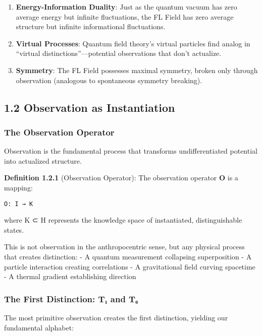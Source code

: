 \begin{enumerate}
\def\labelenumi{\arabic{enumi}.}
\item
  \textbf{Energy-Information Duality}: Just as the quantum vacuum has
  zero average energy but infinite fluctuations, the FL Field has zero
  average structure but infinite informational fluctuations.
\item
  \textbf{Virtual Processes}: Quantum field theory's virtual particles
  find analog in ``virtual distinctions''---potential observations that
  don't actualize.
\item
  \textbf{Symmetry}: The FL Field possesses maximal symmetry, broken
  only through observation (analogous to spontaneous symmetry breaking).
\end{enumerate}

\subsection{1.2 Observation as
Instantiation}\label{observation-as-instantiation}

\subsubsection{The Observation Operator}\label{the-observation-operator}

Observation is the fundamental process that transforms undifferentiated
potential into actualized structure.

\textbf{Definition 1.2.1} (Observation Operator): The observation
operator \textbf{O} is a mapping:

\begin{verbatim}
O: I → K
\end{verbatim}

where K ⊂ H represents the knowledge space of instantiated,
distinguishable states.

This is not observation in the anthropocentric sense, but any physical
process that creates distinction: - A quantum measurement collapsing
superposition - A particle interaction creating correlations - A
gravitational field curving spacetime - A thermal gradient establishing
direction

\subsubsection{The First Distinction: T₁ and
T₀}\label{the-first-distinction-tux2081-and-tux2080}

The most primitive observation creates the first distinction, yielding
our fundamental alphabet:

